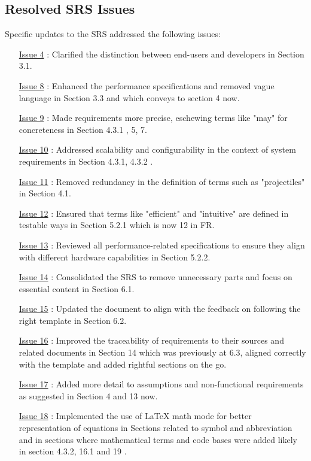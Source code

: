 \documentclass[12pt]{article}
\begin{document}
\subsection{Resolved SRS Issues}
Specific updates to the SRS addressed the following issues:
\begin{itemize}
\item [\href{https://github.com/XessX/Angry_Bird_Alike/issues/4}{Issue 4}]: Clarified the distinction between end-users and developers in Section 3.1.
    \item [\href{https://github.com/XessX/Angry_Bird_Alike/issues/8}{Issue 8}]: Enhanced the performance specifications and removed vague language in Section 3.3 and which conveys to section 4 now.
    \item [\href{https://github.com/XessX/Angry_Bird_Alike/issues/9}{Issue 9}]: Made requirements more precise, eschewing terms like "may" for concreteness in Section 4.3.1 , 5, 7.
    \item [\href{https://github.com/XessX/Angry_Bird_Alike/issues/10}{Issue 10}]: Addressed scalability and configurability in the context of system requirements in Section 4.3.1, 4.3.2 .
    \item [\href{https://github.com/XessX/Angry_Bird_Alike/issues/11}{Issue 11}]: Removed redundancy in the definition of terms such as "projectiles" in Section 4.1.
    \item [\href{https://github.com/XessX/Angry_Bird_Alike/issues/12}{Issue 12}]: Ensured that terms like "efficient" and "intuitive" are defined in testable ways in Section 5.2.1 which is now 12 in FR.
    \item [\href{https://github.com/XessX/Angry_Bird_Alike/issues/13}{Issue 13}]: Reviewed all performance-related specifications to ensure they align with different hardware capabilities in Section 5.2.2.
    \item [\href{https://github.com/XessX/Angry_Bird_Alike/issues/14}{Issue 14}]: Consolidated the SRS to remove unnecessary parts and focus on essential content in Section 6.1.
    \item [\href{https://github.com/XessX/Angry_Bird_Alike/issues/15}{Issue 15}]: Updated the document to align with the feedback on following the right template in Section 6.2.
    \item [\href{https://github.com/XessX/Angry_Bird_Alike/issues/16}{Issue 16}]: Improved the traceability of requirements to their sources and related documents in Section 14 which was previously at 6.3, aligned correctly with the template and added rightful sections on the go.
    \item [\href{https://github.com/XessX/Angry_Bird_Alike/issues/17}{Issue 17}]: Added more detail to assumptions and non-functional requirements as suggested in Section 4 and 13 now.
    \item [\href{https://github.com/XessX/Angry_Bird_Alike/issues/18}{Issue 18}]: Implemented the use of LaTeX math mode for better representation of equations in Sections related to symbol and abbreviation and in sections where mathematical terms and code bases were added likely in section 4.3.2, 16.1 and 19 .
\end{itemize}
\end{document}
